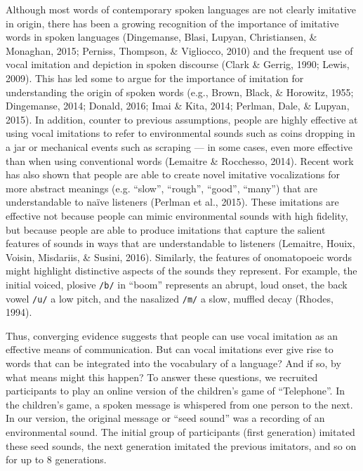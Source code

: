 \documentclass[english,floatsintext,man]{apa6}
\theoremstyle{definition}
\theoremstyle{definition}
\theoremstyle{remark}
\begin{document}
Although most words of contemporary spoken languages are not clearly
imitative in origin, there has been a growing recognition of the
importance of imitative words in spoken languages (Dingemanse, Blasi,
Lupyan, Christiansen, \& Monaghan, 2015; Perniss, Thompson, \&
Vigliocco, 2010) and the frequent use of vocal imitation and depiction
in spoken discourse (Clark \& Gerrig, 1990; Lewis, 2009). This has led
some to argue for the importance of imitation for understanding the
origin of spoken words (e.g., Brown, Black, \& Horowitz, 1955;
Dingemanse, 2014; Donald, 2016; Imai \& Kita, 2014; Perlman, Dale, \&
Lupyan, 2015). In addition, counter to previous assumptions, people are
highly effective at using vocal imitations to refer to environmental
sounds such as coins dropping in a jar or mechanical events such as
scraping --- in some cases, even more effective than when using
conventional words (Lemaitre \& Rocchesso, 2014). Recent work has also
shown that people are able to create novel imitative vocalizations for
more abstract meanings (e.g. \enquote{slow}, \enquote{rough},
\enquote{good}, \enquote{many}) that are understandable to naïve
listeners (Perlman et al., 2015). These imitations are effective not
because people can mimic environmental sounds with high fidelity, but
because people are able to produce imitations that capture the salient
features of sounds in ways that are understandable to listeners
(Lemaitre, Houix, Voisin, Misdariis, \& Susini, 2016). Similarly, the
features of onomatopoeic words might highlight distinctive aspects of
the sounds they represent. For example, the initial voiced, plosive
\texttt{/b/} in \enquote{boom} represents an abrupt, loud onset, the
back vowel \texttt{/u/} a low pitch, and the nasalized \texttt{/m/} a
slow, muffled decay (Rhodes, 1994).

Thus, converging evidence suggests that people can use vocal imitation
as an effective means of communication. But can vocal imitations ever
give rise to words that can be integrated into the vocabulary of a
language? And if so, by what means might this happen? To answer these
questions, we recruited participants to play an online version of the
children's game of \enquote{Telephone}. In the children's game, a spoken
message is whispered from one person to the next. In our version, the
original message or \enquote{seed sound} was a recording of an
environmental sound. The initial group of participants (first
generation) imitated these seed sounds, the next generation imitated the
previous imitators, and so on for up to 8 generations.
\end{document}
